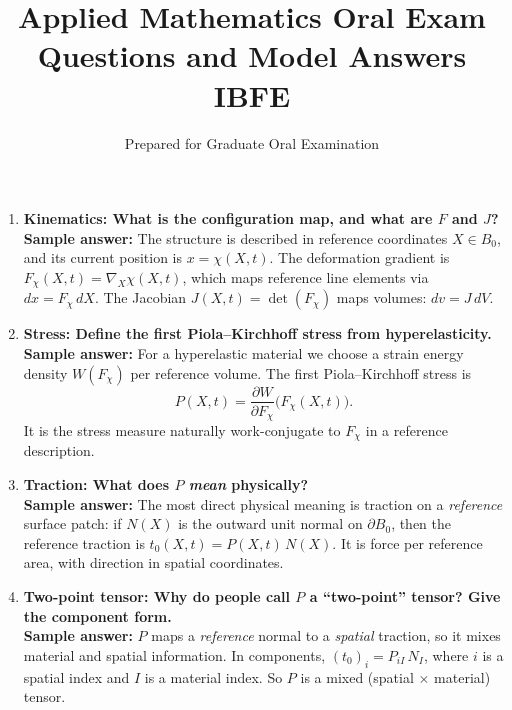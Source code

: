 \documentclass[12pt]{article}
\title{\vspace{-2em}\textbf{Applied Mathematics Oral Exam Questions and Model Answers}\\
\large IBFE}
\author{Prepared for Graduate Oral Examination}
\date{}
\begin{document}
\maketitle

\begin{enumerate}

\item \textbf{Kinematics: What is the configuration map, and what are $F$ and $J$?}\\
\textbf{Sample answer:} The structure is described in reference coordinates $X\in B_0$, and its current position is
$x=\chi(X,t)$. The deformation gradient is $F_\chi(X,t)=\nabla_X \chi(X,t)$, which maps reference line elements via
$d x = F_\chi\, dX$. The Jacobian $J(X,t)=\det(F_\chi)$ maps volumes: $dv = J\, dV$.

\item \textbf{Stress: Define the first Piola--Kirchhoff stress from hyperelasticity.}\\
\textbf{Sample answer:} For a hyperelastic material we choose a strain energy density $W(F_\chi)$ per reference volume.
The first Piola--Kirchhoff stress is
\[
P(X,t) = \frac{\partial W}{\partial F_\chi}\bigl(F_\chi(X,t)\bigr).
\]
It is the stress measure naturally work-conjugate to $F_\chi$ in a reference description.

\item \textbf{Traction: What does $P$ \emph{mean} physically?}\\
\textbf{Sample answer:} The most direct physical meaning is traction on a \emph{reference} surface patch:
if $N(X)$ is the outward unit normal on $\partial B_0$, then the reference traction is
$t_0(X,t)=P(X,t)\,N(X)$. It is force per reference area, with direction in spatial coordinates.

\item \textbf{Two-point tensor: Why do people call $P$ a ``two-point'' tensor? Give the component form.}\\
\textbf{Sample answer:} $P$ maps a \emph{reference} normal to a \emph{spatial} traction, so it mixes material and spatial
information. In components, $(t_0)_i = P_{iI}\,N_I$, where $i$ is a spatial index and $I$ is a material index. So $P$ is
a mixed (spatial $\times$ material) tensor.


\end{enumerate}
\end{document}
